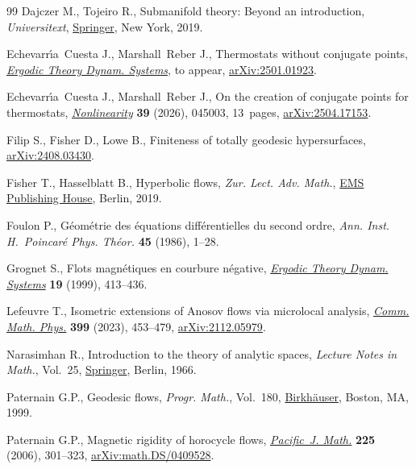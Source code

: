\documentclass[pdftex]{sigma}
\numberwithin{equation}{section}
\theoremstyle{definition}
\begin{document}
\begin{thebibliography}{99}
Dajczer M., Tojeiro R., Submanifold theory: {B}eyond an introduction,
 \textit{Universitext}, \href{https://doi.org/10.1007/978-1-4939-9644-5}{Springer}, New
 York, 2019.

Echevarr\'{\i}a~Cuesta J., Marshall~Reber J., Thermostats without conjugate
 points, \href{http://dx.doi.org/10.1017/etds.2026.10285}{\textit{Ergodic
 Theory Dynam. Systems}}, {t}o appear,
 \href{http://arxiv.org/abs/2501.01923}{arXiv:2501.01923}.

Echevarr\'{\i}a~Cuesta J., Marshall~Reber J., On the creation of conjugate
 points for thermostats,
 \href{https://doi.org/10.1088/1361-6544/ae5569}{\textit{Nonlinearity}}
 \textbf{39} (2026), 045003, 13~pages,
 \href{http://arxiv.org/abs/2504.17153}{arXiv:2504.17153}.

Filip S., Fisher D., Lowe B., Finiteness of totally geodesic hypersurfaces,
 \href{http://arxiv.org/abs/2408.03430}{arXiv:2408.03430}.

Fisher T., Hasselblatt B., Hyperbolic flows, \textit{Zur. Lect. Adv. Math.},
 \href{https://doi.org/10.4171/200}{EMS Publishing House}, Berlin, 2019.

Foulon P., G\'{e}om\'{e}trie des \'{e}quations diff\'{e}rentielles du second
 ordre, \textit{Ann. Inst. H.~Poincar\'{e} Phys. Th\'{e}or.} \textbf{45}
 (1986), 1--28.

Grognet S., Flots magn\'{e}tiques en courbure n\'{e}gative,
 \href{https://doi.org/10.1017/S0143385799126634}{\textit{Ergodic Theory
 Dynam. Systems}} \textbf{19} (1999), 413--436.

Lefeuvre T., Isometric extensions of {A}nosov flows via microlocal analysis,
 \href{https://doi.org/10.1007/s00220-022-04561-0}{\textit{Comm. Math. Phys.}}
 \textbf{399} (2023), 453--479,
 \href{http://arxiv.org/abs/2112.05979}{arXiv:2112.05979}.

Narasimhan R., Introduction to the theory of analytic spaces, \textit{Lecture
 Notes in Math.}, Vol.~25, \href{https://doi.org/10.1007/BFb0077071}{Springer}, Berlin, 1966.

Paternain G.P., Geodesic flows, \textit{Progr. Math.}, Vol.~180,
 \href{https://doi.org/10.1007/978-1-4612-1600-1}{Birkh\"{a}user}, Boston, MA,
 1999.

Paternain G.P., Magnetic rigidity of horocycle flows,
 \href{https://doi.org/10.2140/pjm.2006.225.301}{\textit{Pacific~J. Math.}}
 \textbf{225} (2006), 301--323,
 \href{http://arxiv.org/abs/math.DS/0409528}{arXiv:math.DS/0409528}.


\end{thebibliography}
\end{document}
